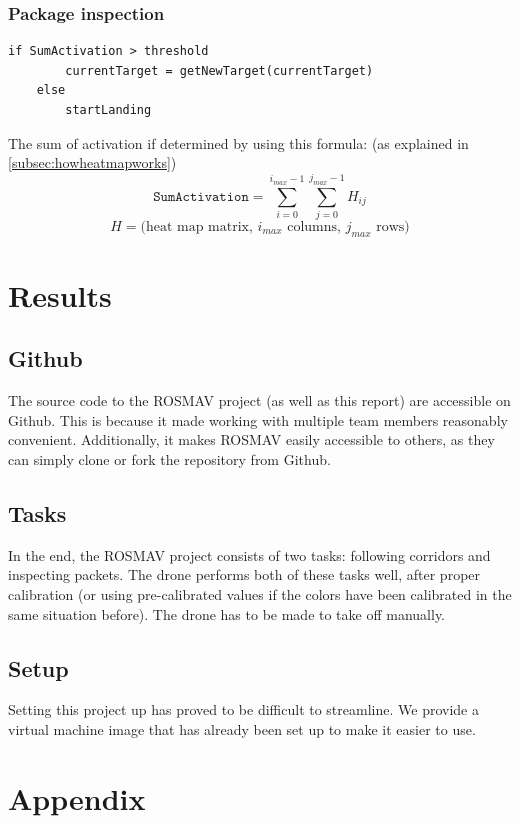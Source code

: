 \documentclass[a4paper,10pt]{article}
\begin{document}
\subsubsection{Package inspection\label{sec:packageinspection}}
\begin{verbatim}
if SumActivation > threshold
        currentTarget = getNewTarget(currentTarget)
    else
        startLanding
\end{verbatim}
The sum of activation if determined by using this formula: (as explained in \ref{subsec:howheatmapworks})
\[\texttt{SumActivation} = \sum_{i=0}^{i_{max}-1} \sum_{j=0}^{j_{max}-1} H_{ij}\]
\[H = \textrm{(heat map matrix, $i_{max}$ columns, $j_{max}$ rows)}\]

\section{Results}

\subsection{Github}
The source code to the ROSMAV project (as well as this report) are accessible
on Github. This is because it made working with multiple team members
reasonably convenient. Additionally, it makes ROSMAV easily accessible to
others, as they can simply clone or fork the repository from Github.
\subsection{Tasks}
In the end, the ROSMAV project consists of two tasks: following corridors and
inspecting packets. The drone performs both of these tasks well, after proper
calibration (or using pre-calibrated values if the colors have been calibrated
in the same situation before). The drone has to be made to take off manually.
\subsection{Setup}
Setting this project up has proved to be difficult to streamline. We provide
a virtual machine image that has already been set up to make it easier to use.



\section*{Appendix}
\end{document}

